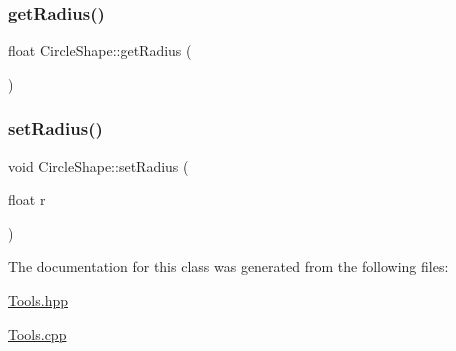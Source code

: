 \subsubsection{\texorpdfstring{get\+Radius()}{getRadius()}}
{\footnotesize\ttfamily float Circle\+Shape\+::get\+Radius (\begin{DoxyParamCaption}{ }\end{DoxyParamCaption})}

\hypertarget{class_circle_shape_af317d58be28370ba183df07734fde939}{}\label{class_circle_shape_af317d58be28370ba183df07734fde939} 
\subsubsection{\texorpdfstring{set\+Radius()}{setRadius()}}
{\footnotesize\ttfamily void Circle\+Shape\+::set\+Radius (\begin{DoxyParamCaption}\item[{float}]{r }\end{DoxyParamCaption})}



The documentation for this class was generated from the following files\+:\begin{DoxyCompactItemize}
\item 
\hyperlink{_tools_8hpp}{Tools.\+hpp}\item 
\hyperlink{_tools_8cpp}{Tools.\+cpp}\end{DoxyCompactItemize}
